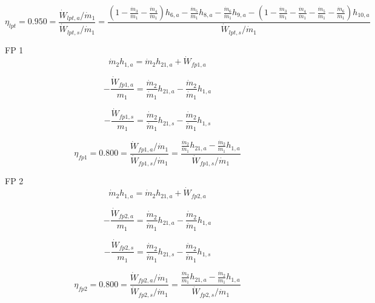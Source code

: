 \documentclass{article}
\begin{document}
\begin{equation}
\eta_{lpt} =    0.950 = \frac{\dot{W}_{lpt,a} / \dot{m}_{1}}{\dot{W}_{lpt,s} / \dot{m}_{1}} = \frac{
(1 - \frac{\dot{m}_{ 3}}{\dot{m}_{ 1}} - \frac{\dot{m}_{ 4}}{\dot{m}_{ 1}})h_{ 6,a} - \frac{\dot{m}_{ 5}}{\dot{m}_{ 1}}h_{ 8,a} - \frac{\dot{m}_{ 6}}{\dot{m}_{ 1}}h_{ 9,a} - (1 - \frac{\dot{m}_{ 3}}{\dot{m}_{ 1}} - \frac{\dot{m}_{ 4}}{\dot{m}_{ 1}} - \frac{\dot{m}_{ 5}}{\dot{m}_{ 1}} - \frac{\dot{m}_{ 6}}{\dot{m}_{ 1}})h_{10,a}}{\dot{W}_{lpt,s} / \dot{m}_{1}}
\end{equation}


FP 1
\begin{equation}
\dot{m}_{ 2}h_{ 1,a} = \dot{m}_{ 2}h_{21,a} + \dot{W}_{fp1,a}
\end{equation}

\begin{equation}
-\frac{\dot{W}_{fp1,a}}{m_1} = \frac{\dot{m}_{ 2}}{\dot{m}_{ 1}}h_{21,a} - \frac{\dot{m}_{ 2}}{\dot{m}_{ 1}}h_{ 1,a}\end{equation}

\begin{equation}
-\frac{\dot{W}_{fp1,s}}{m_1} = \frac{\dot{m}_{ 2}}{\dot{m}_{ 1}}h_{21,s} - \frac{\dot{m}_{ 2}}{\dot{m}_{ 1}}h_{ 1,s}\end{equation}

\begin{equation}
\eta_{fp1} =    0.800 = \frac{\dot{W}_{fp1,a} / \dot{m}_{1}}{\dot{W}_{fp1,s} / \dot{m}_{1}} = \frac{
\frac{\dot{m}_{ 2}}{\dot{m}_{ 1}}h_{21,a} - \frac{\dot{m}_{ 2}}{\dot{m}_{ 1}}h_{ 1,a}}{\dot{W}_{fp1,s} / \dot{m}_{1}}
\end{equation}


FP 2
\begin{equation}
\dot{m}_{ 2}h_{ 1,a} = \dot{m}_{ 2}h_{21,a} + \dot{W}_{fp2,a}
\end{equation}

\begin{equation}
-\frac{\dot{W}_{fp2,a}}{m_1} = \frac{\dot{m}_{ 2}}{\dot{m}_{ 1}}h_{21,a} - \frac{\dot{m}_{ 2}}{\dot{m}_{ 1}}h_{ 1,a}\end{equation}

\begin{equation}
-\frac{\dot{W}_{fp2,s}}{m_1} = \frac{\dot{m}_{ 2}}{\dot{m}_{ 1}}h_{21,s} - \frac{\dot{m}_{ 2}}{\dot{m}_{ 1}}h_{ 1,s}\end{equation}

\begin{equation}
\eta_{fp2} =    0.800 = \frac{\dot{W}_{fp2,a} / \dot{m}_{1}}{\dot{W}_{fp2,s} / \dot{m}_{1}} = \frac{
\frac{\dot{m}_{ 2}}{\dot{m}_{ 1}}h_{21,a} - \frac{\dot{m}_{ 2}}{\dot{m}_{ 1}}h_{ 1,a}}{\dot{W}_{fp2,s} / \dot{m}_{1}}
\end{equation}
\end{document}

